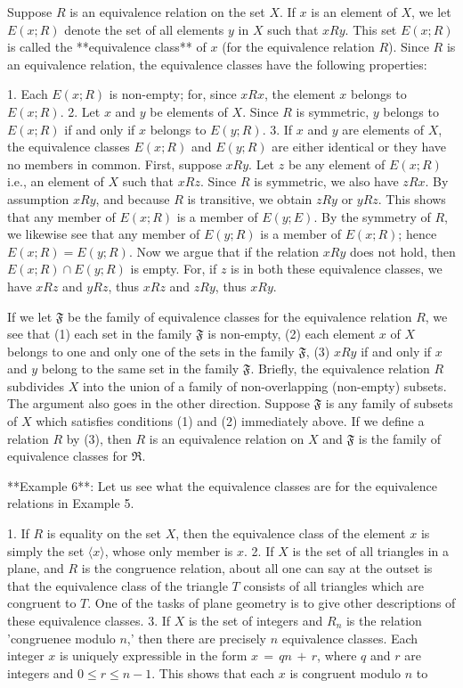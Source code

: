 Suppose \(R\) is an equivalence relation on the set \(X\). If \(x\) is an element of \(X\), we let \(E(x;R)\) denote the set of all elements \(y\) in \(X\) such that \(xRy\). This set \(E(x;R)\) is called the **equivalence class** of \(x\) (for the equivalence relation \(R\)). Since \(R\) is an equivalence relation, the equivalence classes have the following properties:

1. Each \(E(x;R)\) is non-empty; for, since \(xRx\), the element \(x\) belongs to \(E(x;R)\).
2. Let \(x\) and \(y\) be elements of \(X\). Since \(R\) is symmetric, \(y\) belongs to \(E(x;R)\) if and only if \(x\) belongs to \(E(y;R)\).
3. If \(x\) and \(y\) are elements of \(X\), the equivalence classes \(E(x;R)\) and \(E(y;R)\) are either identical or they have no members in common. First, suppose \(xRy\). Let \(z\) be any element of \(E(x;R)\) i.e., an element of \(X\) such that \(xRz\). Since \(R\) is symmetric, we also have \(zRx\). By assumption \(xRy\), and because \(R\) is transitive, we obtain \(zRy\) or \(yRz\). This shows that any member of \(E(x;R)\) is a member of \(E(y;E)\). By the symmetry of \(R\), we likewise see that any member of \(E(y;R)\) is a member of \(E(x;R)\); hence \(E(x;R)=E(y;R)\). Now we argue that if the relation \(xRy\) does not hold, then \(E(x;R)\cap E(y;R)\) is empty. For, if \(z\) is in both these equivalence classes, we have \(xRz\) and \(yRz\), thus \(xRz\) and \(zRy\), thus \(xRy\).

If we let \(\mathfrak{F}\) be the family of equivalence classes for the equivalence relation \(R\), we see that (1) each set in the family \(\mathfrak{F}\) is non-empty, (2) each element \(x\) of \(X\) belongs to one and only one of the sets in the family \(\mathfrak{F}\), (3) \(xRy\) if and only if \(x\) and \(y\) belong to the same set in the family \(\mathfrak{F}\). Briefly, the equivalence relation \(R\) subdivides \(X\) into the union of a family of non-overlapping (non-empty) subsets. The argument also goes in the other direction. Suppose \(\mathfrak{F}\) is any family of subsets of \(X\) which satisfies conditions (1) and (2) immediately above. If we define a relation \(R\) by (3), then \(R\) is an equivalence relation on \(X\) and \(\mathfrak{F}\) is the family of equivalence classes for \(\mathfrak{R}\).

**Example 6**: Let us see what the equivalence classes are for the equivalence relations in Example 5.

1. If \(R\) is equality on the set \(X\), then the equivalence class of the element \(x\) is simply the set \(\langle x\rangle\), whose only member is \(x\).
2. If \(X\) is the set of all triangles in a plane, and \(R\) is the congruence relation, about all one can say at the outset is that the equivalence class of the triangle \(T\) consists of all triangles which are congruent to \(T\). One of the tasks of plane geometry is to give other descriptions of these equivalence classes.
3. If \(X\) is the set of integers and \(R_{n}\) is the relation 'congruenee modulo \(n\),' then there are precisely \(n\) equivalence classes. Each integer \(x\) is uniquely expressible in the form \(x\,=\,qn\,+\,r\), where \(q\) and \(r\) are integers and \(0\leq r\leq n-1\). This shows that each \(x\) is congruent modulo \(n\) to 